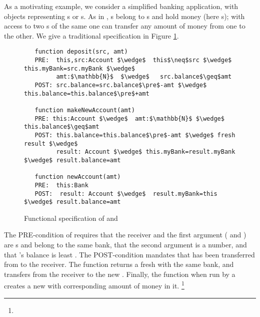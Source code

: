 
As a motivating example, we consider a simplified banking application,
with objects representing s or s. 
As in \cite{ELang},   s belong to s and hold money (here s);  
with access  to two s of the same   one can  transfer any amount of money from
 one to the other.  We give a traditional specification in Figure \ref{fig:BankSpec}.

\begin{figure}[htbp] 
\begin{lstlisting}
   function deposit(src, amt)
   PRE:  this,src:Account $\wedge$  this$\neq$src $\wedge$ this.myBank=src.myBank $\wedge$ 
         amt:$\mathbb{N}$  $\wedge$   src.balance$\geq$amt
   POST: src.balance=src.balance$\pre$-amt $\wedge$ this.balance=this.balance$\pre$+amt

   function makeNewAccount(amt)
   PRE: this:Account $\wedge$  amt:$\mathbb{N}$ $\wedge$  this.balance$\geq$amt
   POST: this.balance=this.balance$\pre$-amt $\wedge$ fresh result $\wedge$ 
         result: Account $\wedge$ this.myBank=result.myBank $\wedge$ result.balance=amt

   function newAccount(amt)
   PRE:  this:Bank  
   POST:  result: Account $\wedge$  result.myBank=this $\wedge$ result.balance=amt
 \end{lstlisting}
 \vspace{-.8cm}
\caption{Functional specification of  and 
%
}
\label{fig:functionalSpecBankAccount}
\label{fig:BankSpec}
\end{figure} 

The PRE-condition of  requires that  the receiver and the
first argument  ( and ) are s
and belong to the same bank,
that the second argument  is a number, and that 's
balance is least .
The POST-condition mandates that  has been transferred from  to the receiver.
 The function   returns a fresh  with the same bank, and transfers 
 from the receiver  to the new .
 Finally, the function  when run by a  creates a new  with corresponding 
 amount of money in it. \footnote{ }


